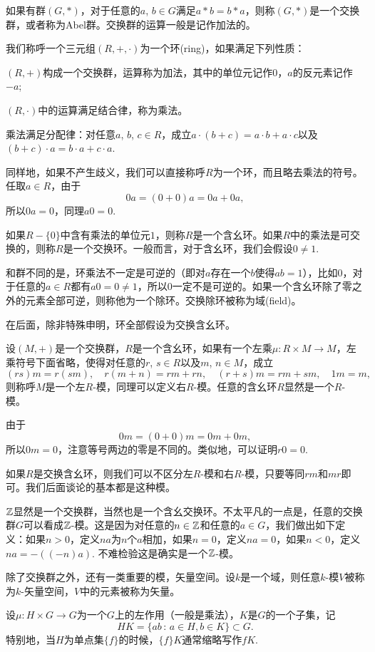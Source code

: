 如果有群$(G,*)$，对于任意的$a$, $b\in G$满足$a*b=b*a$，则称$(G,*)$是一个交换群，或者称为Abel群。交换群的运算一般是记作加法的。

\para 我们称呼一个三元组$(R,+,\cdot)$为一个环(ring)，如果满足下列性质：

 $(R,+)$构成一个交换群，运算称为加法，其中的单位元记作$0$，$a$的反元素记作$-a$;

 $(R,\cdot)$中的运算满足结合律，称为乘法。

 乘法满足分配律：对任意$a$, $b$, $c \in R$，成立$a\cdot(b+c)=a\cdot b+a\cdot c$以及$(b+c)\cdot a=b\cdot a+c\cdot a$.

同样地，如果不产生歧义，我们可以直接称呼$R$为一个环，而且略去乘法的符号。任取$a\in R$，由于
\[
	0a=(0+0)a=0a+0a,
\]
所以$0a=0$，同理$a0=0$.

如果$R-\{0\}$中含有乘法的单位元$1$，则称$R$是一个含幺环。如果$R$中的乘法是可交换的，则称$R$是一个交换环。一般而言，对于含幺环，我们会假设$0\neq 1$.

和群不同的是，环乘法不一定是可逆的（即对$a$存在一个$b$使得$ab=1$），比如$0$，对于任意的$a\in R$都有$a0=0\neq 1$，所以$0$一定不是可逆的。如果一个含幺环除了零之外的元素全部可逆，则称他为一个除环。交换除环被称为域(field)。

在后面，除非特殊申明，环全部假设为交换含幺环。

\para 设$(M,+)$是一个交换群，$R$是一个含幺环，如果有一个左乘$\mu:R\times M\to M$，左乘符号下面省略，使得对任意的$r$, $s\in R$以及$m$, $n\in M$，成立
\[
	(rs)m=r(sm),\quad r(m+n)=rm+rn,\quad (r+s)m=rm+sm,\quad 1m=m,
\]
则称呼$M$是一个左$R$-模，同理可以定义右$R$-模。任意的含幺环$R$显然是一个$R$-模。

由于
\[
	0m=(0+0)m=0m+0m,
\]
所以$0m=0$，注意等号两边的零是不同的。类似地，可以证明$r0=0$. 

如果$R$是交换含幺环，则我们可以不区分左$R$-模和右$R$-模，只要等同$rm$和$mr$即可。我们后面谈论的基本都是这种模。

\para $\mathbb{Z}$显然是一个交换群，当然也是一个含幺交换环。不太平凡的一点是，任意的交换群$G$可以看成$\mathbb{Z}$-模。这是因为对任意的$n\in \mathbb{Z}$和任意的$a\in G$，我们做出如下定义：如果$n>0$，定义$na$为$n$个$a$相加，如果$n=0$，定义$na=0$，如果$n<0$，定义$na=-((-n)a)$. 不难检验这是确实是一个$\mathbb{Z}$-模。

\para 除了交换群之外，还有一类重要的模，矢量空间。设$k$是一个域，则任意$k$-模$V$被称为$k$-矢量空间，$V$中的元素被称为矢量。

\para 设$\mu:H\times G\to G$为一个$G$上的左作用（一般是乘法），$K$是$G$的一个子集，记
\[
	HK=\{ab\,:\,a\in H,b\in K\}\subset G.
\]
特别地，当$H$为单点集$\{f\}$的时候，$\{f\}K$通常缩略写作$fK$.

